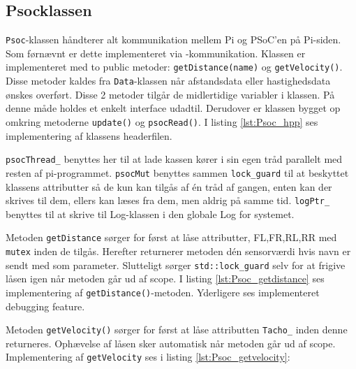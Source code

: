 \subsection{Psocklassen}

\texttt{Psoc}-klassen håndterer alt kommunikation mellem Pi og PSoC'en på Pi-siden. Som førnævnt er dette implementeret via \IIC-kommunikation. Klassen er implementeret med to public metoder: \texttt{getDistance(name)} og \texttt{getVelocity()}. Disse metoder kaldes fra \texttt{Data}-klassen når afstandsdata eller hastighedsdata ønskes overført. Disse 2 metoder tilgår de midlertidige variabler i klassen. På denne måde holdes et enkelt interface udadtil. Derudover er klassen bygget op omkring metoderne \texttt{update()} og \texttt{psocRead()}. I listing \ref{lst:Psoc_hpp} ses implementering af klassens headerfilen.


	
	
\texttt{psocThread\_} benyttes her til at lade kassen kører i sin egen tråd parallelt med resten af pi-programmet. \texttt{psocMut} benyttes sammen \texttt{lock\_guard} til at beskyttet klassens attributter så de kun kan tilgås af én tråd af gangen, enten kan der skrives til dem, ellers kan læses fra dem, men aldrig på samme tid. \texttt{logPtr\_} benyttes til at skrive til Log-klassen i den globale Log for systemet.


Metoden \texttt{getDistance} sørger for først at låse attributter, FL,FR,RL,RR med \texttt{mutex} inden de tilgås. Herefter returnerer metoden dén sensorværdi hvis navn er sendt med som parameter. Slutteligt sørger \texttt{std::lock\_guard} selv for at frigive låsen igen når metoden går ud af scope. I listing \ref{lst:Psoc_getdistance} ses implementering af \texttt{getDistance()}-metoden. Yderligere ses implementeret debugging feature.


	

Metoden \texttt{getVelocity()} sørger for først at låse attributten \texttt{Tacho\_} inden denne returneres. Ophævelse af låsen sker automatisk når metoden går ud af scope. Implementering af \texttt{getVelocity} ses i listing \ref{lst:Psoc_getvelocity}:




